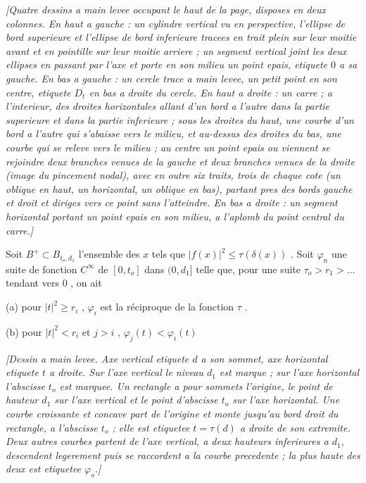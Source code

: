 \begin{center}\emph{[Quatre dessins a main levee occupant le haut de la page, disposes en deux colonnes. En haut a gauche : un cylindre vertical vu en perspective, l'ellipse de bord superieure et l'ellipse de bord inferieure tracees en trait plein sur leur moitie avant et en pointille sur leur moitie arriere ; un segment vertical joint les deux ellipses en passant par l'axe et porte en son milieu un point epais, etiquete $0$ a sa gauche. En bas a gauche : un cercle trace a main levee, un petit point en son centre, etiquete $D_t$ en bas a droite du cercle. En haut a droite : un carre ; a l'interieur, des droites horizontales allant d'un bord a l'autre dans la partie superieure et dans la partie inferieure ; sous les droites du haut, une courbe d'un bord a l'autre qui s'abaisse vers le milieu, et au-dessus des droites du bas, une courbe qui se releve vers le milieu ; au centre un point epais ou viennent se rejoindre deux branches venues de la gauche et deux branches venues de la droite (image du pincement nodal), avec en outre six traits, trois de chaque cote (un oblique en haut, un horizontal, un oblique en bas), partant pres des bords gauche et droit et diriges vers ce point sans l'atteindre. En bas a droite : un segment horizontal portant un point epais en son milieu, a l'aplomb du point central du carre.]}\end{center}

Soit $B^+ \subset B_{t_o,d_1}$ l'ensemble des $x$ tels que $|f(x)|^2 \leq \tau(\delta(x))$ . Soit $\varphi_n$ une suite de fonction $C^\infty$ de $[0, t_o]$ dans $(0, d_1]$ telle que, pour une suite $\tau_o > r_1 > \ldots$ tendant vers $0$ , on ait

(a) pour $|t|^2 \geq r_i$ , $\varphi_i$ est la réciproque de la fonction $\tau$ .

(b) pour $|t|^2 < r_i$ et $j > i$ , $\varphi_j(t) < \varphi_i(t)$

\begin{center}\emph{[Dessin a main levee. Axe vertical etiquete $d$ a son sommet, axe horizontal etiquete $t$ a droite. Sur l'axe vertical le niveau $d_1$ est marque ; sur l'axe horizontal l'abscisse $t_o$ est marquee. Un rectangle a pour sommets l'origine, le point de hauteur $d_1$ sur l'axe vertical et le point d'abscisse $t_o$ sur l'axe horizontal. Une courbe croissante et concave part de l'origine et monte jusqu'au bord droit du rectangle, a l'abscisse $t_o$ ; elle est etiquetee $t=\tau(d)$ a droite de son extremite. Deux autres courbes partent de l'axe vertical, a deux hauteurs inferieures a $d_1$, descendent legerement puis se raccordent a la courbe precedente ; la plus haute des deux est etiquetee $\varphi_o$.]}\end{center}


